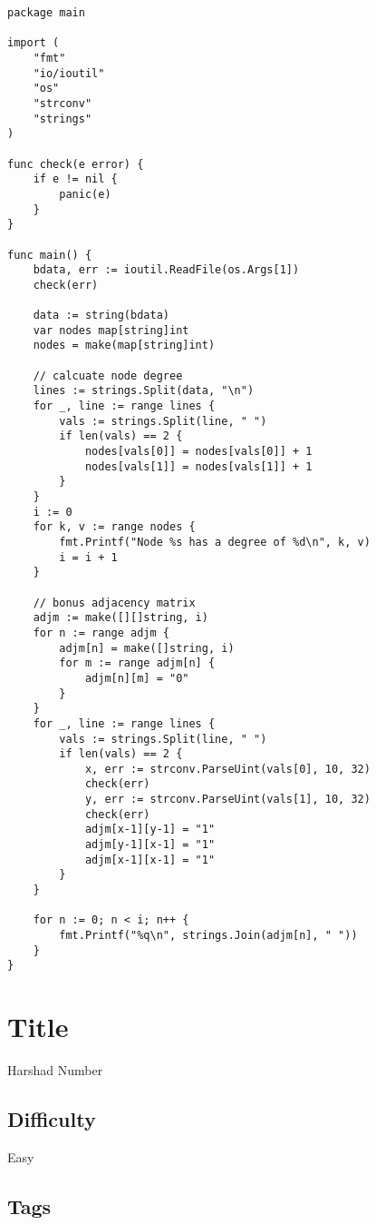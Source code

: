 \begin{verbatim}
package main

import (
    "fmt"
    "io/ioutil"
    "os"
    "strconv"
    "strings"
)

func check(e error) {
    if e != nil {
        panic(e)
    }
}

func main() {
    bdata, err := ioutil.ReadFile(os.Args[1])
    check(err)

    data := string(bdata)
    var nodes map[string]int
    nodes = make(map[string]int)

    // calcuate node degree
    lines := strings.Split(data, "\n")
    for _, line := range lines {
        vals := strings.Split(line, " ")
        if len(vals) == 2 {
            nodes[vals[0]] = nodes[vals[0]] + 1
            nodes[vals[1]] = nodes[vals[1]] + 1
        }
    }
    i := 0
    for k, v := range nodes {
        fmt.Printf("Node %s has a degree of %d\n", k, v)
        i = i + 1
    }

    // bonus adjacency matrix
    adjm := make([][]string, i)
    for n := range adjm {
        adjm[n] = make([]string, i)
        for m := range adjm[n] {
            adjm[n][m] = "0"
        }
    }
    for _, line := range lines {
        vals := strings.Split(line, " ")
        if len(vals) == 2 {
            x, err := strconv.ParseUint(vals[0], 10, 32)
            check(err)
            y, err := strconv.ParseUint(vals[1], 10, 32)
            check(err)
            adjm[x-1][y-1] = "1"
            adjm[y-1][x-1] = "1"
            adjm[x-1][x-1] = "1"
        }
    }

    for n := 0; n < i; n++ {
        fmt.Printf("%q\n", strings.Join(adjm[n], " "))
    }
}
\end{verbatim}

\section{Title}\label{title-27}

Harshad Number

\subsection{Difficulty}\label{difficulty-26}

Easy

\subsection{Tags}\label{tags-27}

